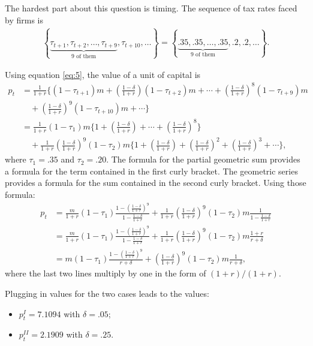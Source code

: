 \documentclass[12pt]{pracjourn_rwr}
\theoremstyle{definition}
\theoremstyle{remark}
\begin{document}
The hardest part about this question is timing.
The sequence of tax rates faced by firms is
\begin{align*}
\left\{ \underbrace{\tau_{t+1},\tau_{t+2},\dots,\tau_{t+9}}_{\text{9 of them}},\tau_{t+10},\dots \right\} =
\left\{ \underbrace{.35, .35, \dots, .35}_{\text{9 of them}},.2, .2,\dots \right\}.
\end{align*}

Using equation \eqref{eq:5}, the value of a unit of capital is
\begin{align*}
p_{t} &= \frac{1}{1+r} \Bigg\{ (1-\tau_{t+1})m + \left( \frac{1-\delta}{1+r} \right)(1-\tau_{t+2})m + \cdots  +
\left( \frac{1-\delta}{1+r} \right)^{8} (1-\tau_{t+9}) m \\
&\quad + \left( \frac{1-\delta}{1+r} \right)^{9} (1-\tau_{t+10}) m + \cdots \Bigg\} \\
&= \frac{1}{1+r} (1-\tau_{1})m \Bigg\{ 1 + \left( \frac{1-\delta}{1+r} \right) + \cdots  +
\left( \frac{1-\delta}{1+r} \right)^{8} \Bigg\} \\
&\quad + \frac{1}{1+r} \left( \frac{1-\delta}{1+r} \right)^{9}(1-\tau_{2})m
\Bigg\{
1 + \left( \frac{1-\delta}{1+r} \right) + \left( \frac{1-\delta}{1+r} \right)^{2} + \left( \frac{1-\delta}{1+r} \right)^{3} + \cdots
\Bigg\},
\end{align*}
where $\tau_{1} = .35$ and $\tau_{2} = .20$.
The formula for the partial geometric sum provides a formula for the term contained in the first curly bracket.
The geometric series provides a formula for the sum contained in the second curly bracket.
Using those formula:
\begin{align*}
p_{t} &= \frac{m}{1+r} (1-\tau_{1}) \frac{1 - \left( \frac{1-\delta}{1+r} \right)^{9}}{1 - \frac{1-\delta}{1+r}} +
\frac{1}{1+r}\left( \frac{1-\delta}{1+r} \right)^{9}(1-\tau_{2})m \frac{1}{1 - \frac{1-\delta}{1+r}} \\
&= \frac{m}{1+r} (1-\tau_{1}) \frac{1 - \left( \frac{1-\delta}{1+r} \right)^{9}}{1 - \frac{1-\delta}{1+r}} +
\frac{1}{1+r} \left( \frac{1-\delta}{1+r} \right)^{9}(1-\tau_{2})m \frac{1+r}{r + \delta} \\
&= m (1-\tau_{1}) \frac{1 - \left( \frac{1-\delta}{1+r} \right)^{9}}{r+\delta} +
\left( \frac{1-\delta}{1+r} \right)^{9}(1-\tau_{2})m \frac{1}{r + \delta},
\end{align*}
where the last two lines multiply by one in the form of $(1+r) / (1+r)$.

Plugging in values for the two cases leads to the values:
\begin{itemize}
\item $p^{I}_{t} = 7.1094$ with $\delta = .05$;
\item $p^{II}_{t} = 2.1909$ with $\delta = .25$.
\end{itemize}
\end{document}
